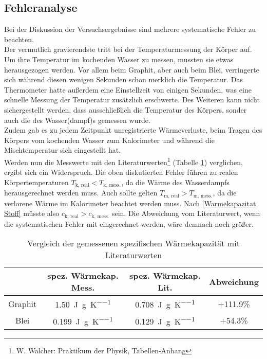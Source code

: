 \subsection{Fehleranalyse}
Bei der Diskussion der Versuchsergebnisse sind mehrere systematische Fehler zu beachten. \\
Der vermutlich gravierendste tritt bei der Temperaturmessung der Körper auf. Um ihre Temperatur im kochenden Wasser zu messen, mussten sie etwas herausgezogen werden. Vor allem beim Graphit, aber auch beim Blei, verringerte sich während diesen wenigen Sekunden schon merklich die Temperatur. Das Thermometer hatte außerdem eine Einstellzeit von einigen Sekunden, was eine schnelle Messung der Temperatur zusätzlich erschwerte. Des Weiteren kann nicht sichergestellt werden, dass ausschließlich die Temperatur des Körpers, sonder auch die des Wasser(dampf)s  gemessen wurde. \\
Zudem gab es zu jedem Zeitpunkt unregistrierte Wärmeverluste, beim Tragen des Körpers vom kochenden Wasser zum Kalorimeter und während die Mischtemperatur sich eingestellt hat. \\


Werden nun die Messwerte mit den Literaturwerten\footnote{W. Walcher: \glqq Praktikum der Physik\grqq, Tabellen-Anhang} (Tabelle \ref{spez. Warmekap. Literatur}) verglichen, ergibt sich ein Widerspruch. Die oben diskutierten Fehler führen zu realen Körpertemperaturen $T_\text{k, real}<T_\text{k, mess.}$, da die Wärme des Wasserdampfs herausgerechnet werden muss. Auch sollte gelten $T_\text{m, real}>T_\text{m, mess.}$, da die verlorene Wärme im Kalorimeter beachtet werden muss. Nach \eqref{Warmekapazitat Stoff} müsste also $c_\text{k, real}>c_\text{k, mess.}$ sein. Die Abweichung vom Literaturwert, wenn die systematischen Fehler mit eingerechnet werden, wäre demnach noch größer. \\

\begin{table}[h]
	\begin{center}
		\begin{tabular}{c | c | c | c}
			& spez. Wärmekap. Mess. & spez. Wärmekap. Lit. & Abweichung \\
			\hline
			Graphit & \SI{1.50}{\joule\per\gram\per\kelvin} & \SI{0.708}{\joule\per\gram\per\kelvin} & +111.9\% \\
			Blei & \SI{0.199}{\joule\per\gram\per\kelvin} & \SI{0.129}{\joule\per\gram\per\kelvin} & +54.3\%
		\end{tabular}
		\caption{Vergleich der gemessenen spezifischen Wärmekapazität mit Literaturwerten}
		\label{spez. Warmekap. Literatur}
	\end{center}
\end{table}

